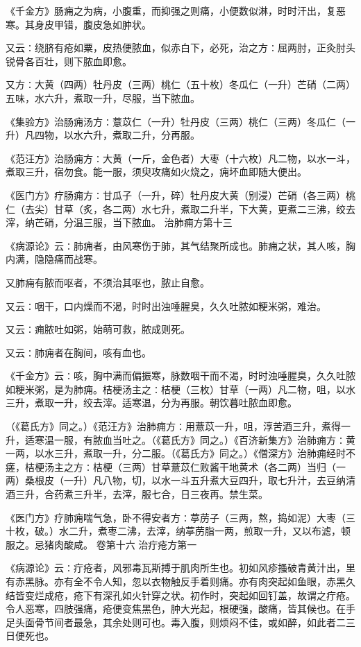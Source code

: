 \documentclass[a4paper,12pt,UTF8,twoside]{ctexbook}
\begin{document}
《千金方》肠痈之为病，小腹重，而抑强之则痛，小便数似淋，时时汗出，复恶寒。其身皮甲错，腹皮急如肿状。

又云∶绕脐有疮如粟，皮热便脓血，似赤白下，必死，治之方∶屈两肘，正灸肘头锐骨各百壮，则下脓血即愈。

又方∶大黄（四两）牡丹皮（三两）桃仁（五十枚）冬瓜仁（一升）芒硝（二两）五味，水六升，煮取一升，尽服，当下脓血。

《集验方》治肠痈汤方∶薏苡仁（一升）牡丹皮（三两）桃仁（三两）冬瓜仁（一升）凡四物，以水六升，煮取二升，分再服。

《范汪方》治肠痈方∶大黄（一斤，金色者）大枣（十六枚）凡二物，以水一斗，煮取三升，宿勿食。能一服，须臾攻痛如火烧之，痈坏血即随大便出。

《医门方》疗肠痈方∶甘瓜子（一升，碎）牡丹皮大黄（别浸）芒硝（各三两）桃仁（去尖）甘草（炙，各二两）水七升，煮取二升半，下大黄，更煮二三沸，绞去滓，纳芒硝，分温三服，当下脓血。
治肺痈方第十三

《病源论》云∶肺痈者，由风寒伤于肺，其气结聚所成也。肺痈之状，其人咳，胸内满，隐隐痛而战寒。

又肺痈有脓而呕者，不须治其呕也，脓止自愈。

又云∶咽干，口内燥而不渴，时时出浊唾腥臭，久久吐脓如粳米粥，难治。

又云∶痈脓吐如粥，始萌可救，脓成则死。

又云∶肺痈者在胸间，咳有血也。

《千金方》云∶咳，胸中满而偏振寒，脉数咽干而不渴，时时浊唾腥臭，久久吐脓如粳米粥，是为肺痈。桔梗汤主之∶桔梗（三枚）甘草（一两）凡二物，咀，以水三升，煮取一升，绞去滓。适寒温，分为再服。朝饮暮吐脓血即愈。

（《葛氏方》同之。）《范汪方》治肺痈方∶用薏苡一升，咀，淳苦酒三升，煮得一升，适寒温一服，有脓血当吐之。（《葛氏方》同之。）《百济新集方》治肺痈方∶黄一两，以水三升，煮取一升，分二服。（《葛氏方》同之。）《僧深方》治肺痈经时不瘥，桔梗汤主之方∶桔梗（三两）甘草薏苡仁败酱干地黄术（各二两）当归（一两）桑根皮（一升）凡八物，切，以水一斗五升煮大豆四升，取七升汁，去豆纳清酒三升，合药煮三升半，去滓，服七合，日三夜再。禁生菜。

《医门方》疗肺痈喘气急，卧不得安者方∶葶苈子（三两，熬，捣如泥）大枣（三十枚，破。）水二升，煮枣二沸，去滓，纳葶苈脂一两，煎取一升，又以布滤，顿服之。忌猪肉酸咸。
卷第十六
治疔疮方第一

《病源论》云∶疔疮者，风邪毒瓦斯搏于肌肉所生也。初如风疹搔破青黄汁出，里有赤黑脉。亦有全不令人知，忽以衣物触反手着则痛。亦有肉突起如鱼眼，赤黑久结皆变烂成疮，疮下有深孔如火针穿之状。初作时，突起如回钉盖，故谓之疔疮。令人恶寒，四肢强痛，疮便变焦黑色，肿大光起，根硬强，酸痛，皆其候也。在手足头面骨节间者最急，其余处则可也。毒入腹，则烦闷不佳，或如醉，如此者二三日便死也。
\end{document}
